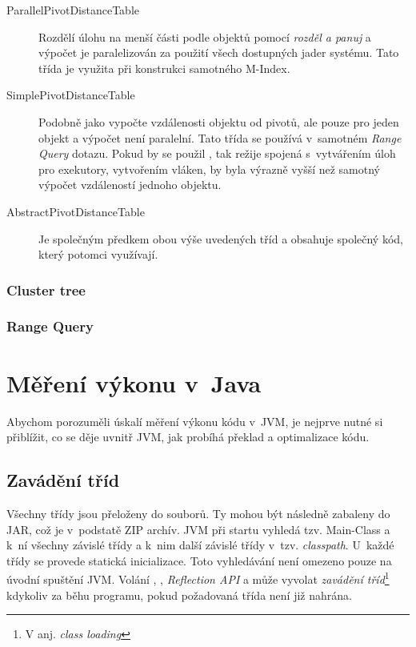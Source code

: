 \begin{description}
\item[ParallelPivotDistanceTable] Rozdělí úlohu na menší části podle objektů pomocí \emph{rozděl a panuj} a výpočet je paralelizován za použití všech dostupných jader systému. Tato třída je využita při konstrukci samotného M-Index.
\item[SimplePivotDistanceTable] Podobně jako  vypočte vzdálenosti objektu od pivotů, ale pouze pro jeden objekt a výpočet není paralelní. Tato třída se používá v~samotném \emph{Range Query} dotazu. Pokud by se použil , tak režije spojená s~vytvářením úloh pro exekutory, vytvořením vláken, by byla výrazně vyšší než samotný výpočet vzdáleností jednoho objektu.
\item[AbstractPivotDistanceTable] Je společným předkem obou výše uvedených tříd a obsahuje společný kód, který potomci využívají.
\end{description}

\subsubsection{Cluster tree}
\subsubsection{Range Query}

\section{Měření výkonu v~Java\label{sec:vykonvjava}}

Abychom porozuměli úskalí měření výkonu kódu v~JVM, je nejprve nutné si přiblížit, co se děje uvnitř JVM, jak probíhá překlad a optimalizace kódu.

\subsection{Zavádění tříd}

Všechny třídy jsou přeloženy do \classfile{} souborů. Ty mohou být následně zabaleny do JAR, což je v~podstatě ZIP archív. JVM při startu vyhledá tzv. Main-Class a k~ní všechny závislé třídy a k~nim další závislé třídy v~tzv. \emph{classpath}. U~každé třídy se provede statická inicializace. Toto vyhledávání není omezeno pouze na úvodní spuštění JVM. Volání , , \emph{Reflection API} a  může vyvolat \emph{zavádění tříd}\footnote{V anj. \emph{class loading}} kdykoliv za běhu programu, pokud požadovaná třída není již nahrána\cite{gosling2013java}\cite{lindholm2013java}.

